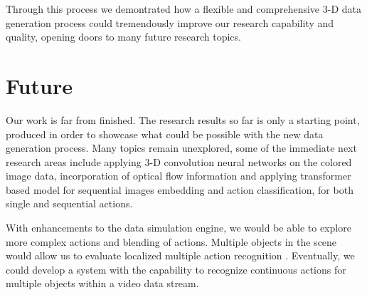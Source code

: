 \documentclass[
	a4paper, %
	10pt, %
	unnumberedsections, %
	twoside, %
]{t0004}
\begin{document}
Through this process we demontrated how a flexible and comprehensive 3-D data generation process could tremendously improve our research capability and quality, opening doors to many future research topics. 

\section{Future}

Our work is far from finished. The research results so far is only a starting point, produced in order to showcase what could be possible with the new data generation process. Many topics remain unexplored, some of the immediate next research areas include applying 3-D convolution neural networks on the colored image data, incorporation of optical flow information and applying transformer based model for sequential images embedding and action classification, for both single and sequential actions.

With enhancements to the data simulation engine, we would be able to explore more complex actions and blending of actions. Multiple objects in the scene would allow us to evaluate localized multiple action recognition \cite{Wu:2023qr}. Eventually, we could develop a system with the capability to recognize continuous actions for multiple objects within a video data stream.





\end{document}
